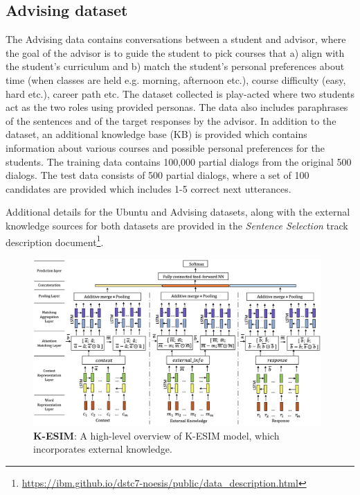 \documentclass[letterpaper]{article} %
\begin{document}
\subsection{Advising dataset}
\label{Advising-dataset}
The Advising data contains conversations between a student and advisor, where the goal of the advisor is to guide the student to pick courses that a) align with the student's curriculum and b) match the student's personal preferences about time (when classes are held e.g. morning, afternoon etc.), course difficulty (easy, hard etc.), career path etc. The dataset collected is play-acted where two students act as the two roles using provided personas. The data also includes paraphrases of the sentences and of the target responses by the advisor. In addition to the dataset, an additional knowledge base (KB) is provided which contains information about various courses and possible personal preferences for the students. The training data contains 100,000 partial dialogs from the original 500 dialogs. The test data consists of 500 partial dialogs, where a set of 100 candidates are provided which includes 1-5 correct next utterances.

Additional details for the Ubuntu and Advising datasets, along with the external knowledge sources for both datasets are provided in the \textit{Sentence Selection} track description document\footnote{\url{https://ibm.github.io/dstc7-noesis/public/data_description.html}}.

\begin{figure}[h]
\centering
\includegraphics[width=0.98\textwidth]{images/esim_manpages_v3_new_2.png}
\caption{\textbf{K-ESIM}: A high-level overview of K-ESIM model, which incorporates external knowledge.}
\label{fig_k_esim}
\end{figure}
\end{document}
